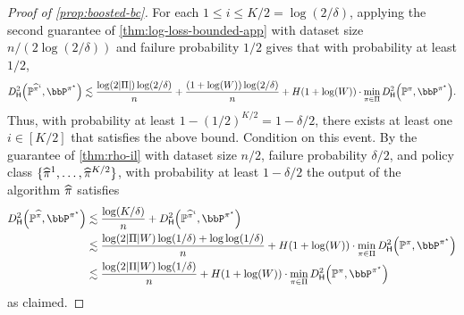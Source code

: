   \begin{proof}[Proof of \cref{prop:boosted-bc}]%
  
For each $1 \leq i \leq K/2 = \log(2/\delta)$, applying the second guarantee of \cref{thm:log-loss-bounded-app} with dataset size $n/(2\log(2/\delta))$ and failure probability $1/2$ gives that with probability at least $1/2$,
\[\Dhels{\BP^{\pihat^i}}{\bbP^{\pistar}} \lesssim \frac{\log(2|\Pi|)\log(2/\delta)}{n} + \frac{(1+\log(\denbound))\log(2/\delta)}{n} + H(1+\log(\denbound)) \cdot \min_{\pi\in\Pi} \Dhels{\BP^\pi}{\bbP^{\pistar}}.\]
Thus, with probability at least $1-(1/2)^{K/2} = 1-\delta/2$, there exists at least one $i \in [K/2]$ that satisfies the above bound. Condition on this event. By the guarantee of \cref{thm:rho-il} with dataset size $n/2$, failure probability $\delta/2$, and policy class $\{\widehat{\pi}^1,\dots,\widehat{\pi}^{K/2}\}$, with probability at least $1-\delta/2$ the output of the algorithm $\widehat{\pi}$ satisfies
\begin{align} 
\Dhels{\BP^{\pihat}}{\bbP^{\pistar}} &\lesssim \frac{\log(K/\delta)}{n} + \Dhels{\BP^{\pihat^i}}{\bbP^{\pistar}}  \\ 
&\lesssim \frac{\log(2|\Pi|\denbound)\log(1/\delta) + \log\log(1/\delta)}{n} + H(1+\log(\denbound)) \cdot \min_{\pi\in\Pi} \Dhels{\BP^\pi}{\bbP^{\pistar}} \\ 
&\lesssim \frac{\log(2|\Pi|\denbound)\log(1/\delta)}{n} + H(1+\log(\denbound)) \cdot \min_{\pi\in\Pi} \Dhels{\BP^\pi}{\bbP^{\pistar}}
\end{align}
as claimed.
\end{proof}

